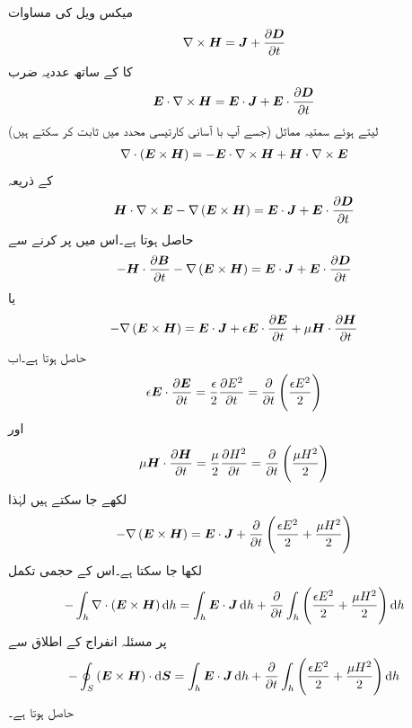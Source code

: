 میکس ویل کی مساوات 
\begin{align*}
\nabla \times {\ensuremath{{\boldsymbol{H}}}}={{\boldsymbol{J}}}+\frac{\partial {\ensuremath{{\boldsymbol{D}}}}}{\partial t}
\end{align*}
کا  کے ساتھ عددیہ ضرب
\begin{align*}
{\ensuremath{{\boldsymbol{E}}}} \cdot \nabla \times {\ensuremath{{\boldsymbol{H}}}}={{\boldsymbol{E}}} \cdot {\ensuremath{{\boldsymbol{J}}}}+{{\boldsymbol{E}}} \cdot \frac{\partial {\ensuremath{{\boldsymbol{D}}}}}{\partial t}
\end{align*}
لیتے ہوئے سمتیہ مماثل (جسے آپ با آسانی کارتیسی محدد میں ثابت کر سکتے ہیں)
\begin{align*}
\nabla \cdot \left({{\boldsymbol{E}}} \times {\ensuremath{{\boldsymbol{H}}}} \right)=-{{\boldsymbol{E}}} \cdot \nabla \times {\ensuremath{{\boldsymbol{H}}}}+{{\boldsymbol{H}}} \cdot \nabla \times {\ensuremath{{\boldsymbol{E}}}}
\end{align*}
کے ذریعہ
\begin{align*}
{\ensuremath{{\boldsymbol{H}}}} \cdot \nabla \times {\ensuremath{{\boldsymbol{E}}}}-\nabla \left({{\boldsymbol{E}}} \times {\ensuremath{{\boldsymbol{H}}}}\right)={{\boldsymbol{E}}} \cdot {\ensuremath{{\boldsymbol{J}}}}+{{\boldsymbol{E}}} \cdot \frac{\partial {\ensuremath{{\boldsymbol{D}}}}}{\partial t}
\end{align*}
حاصل ہوتا ہے۔اس میں  پر کرنے سے
\begin{align*}
-{{\boldsymbol{H}}} \cdot \frac{\partial {\ensuremath{{\boldsymbol{B}}}}}{\partial t}-\nabla \left({{\boldsymbol{E}}} \times {\ensuremath{{\boldsymbol{H}}}}\right)={{\boldsymbol{E}}} \cdot {\ensuremath{{\boldsymbol{J}}}}+{{\boldsymbol{E}}} \cdot \frac{\partial {\ensuremath{{\boldsymbol{D}}}}}{\partial t}
\end{align*}
یا
\begin{align*}
-\nabla \left({{\boldsymbol{E}}} \times {\ensuremath{{\boldsymbol{H}}}}\right)={{\boldsymbol{E}}} \cdot {\ensuremath{{\boldsymbol{J}}}}+\epsilon {\ensuremath{{\boldsymbol{E}}}} \cdot \frac{\partial {\ensuremath{{\boldsymbol{E}}}}}{\partial t}+\mu {\ensuremath{{\boldsymbol{H}}}} \cdot \frac{\partial {\ensuremath{{\boldsymbol{H}}}}}{\partial t}
\end{align*}
حاصل ہوتا ہے۔اب
\begin{align*}
\epsilon {\ensuremath{{\boldsymbol{E}}}} \cdot \frac{\partial {\ensuremath{{\boldsymbol{E}}}}}{\partial t}=\frac{\epsilon}{2}\frac{\partial E^2}{\partial t}=\frac{\partial}{\partial t} \left(\frac{\epsilon E^2}{2} \right)
\end{align*}
اور
\begin{align*}
\mu {\ensuremath{{\boldsymbol{H}}}} \cdot \frac{\partial {\ensuremath{{\boldsymbol{H}}}}}{\partial t}=\frac{\mu}{2}\frac{\partial H^2}{\partial t}=\frac{\partial}{\partial t} \left(\frac{\mu H^2}{2} \right)
\end{align*}
لکھے جا سکتے ہیں لہٰذا
\begin{align*}
-\nabla \left({{\boldsymbol{E}}} \times {\ensuremath{{\boldsymbol{H}}}}\right)={{\boldsymbol{E}}} \cdot {\ensuremath{{\boldsymbol{J}}}}+\frac{\partial}{\partial t} \left(\frac{\epsilon E^2}{2} + \frac{\mu H^2}{2} \right)
\end{align*}
لکھا جا سکتا ہے۔اس کے حجمی تکمل
\begin{align*}
-\int_h \nabla \cdot \left(\kvec{E}\times \kvec{H} \right) \dif h=\int_h \kvec{E} \cdot \kvec{J} \dif h+\frac{\partial}{\partial t}\int_h \left(\frac{\epsilon E^2}{2} + \frac{\mu H^2}{2}  \right) \dif h
\end{align*}
پر مسئلہ انفراج کے اطلاق سے
\begin{align}
-\oint_S \left(\kvec{E}\times \kvec{H} \right) \cdot \dif \kvec{S}=\int_h \kvec{E} \cdot \kvec{J} \dif h+\frac{\partial}{\partial t}\int_h \left(\frac{\epsilon E^2}{2} + \frac{\mu H^2}{2}  \right) \dif h
\end{align}
حاصل ہوتا ہے۔

